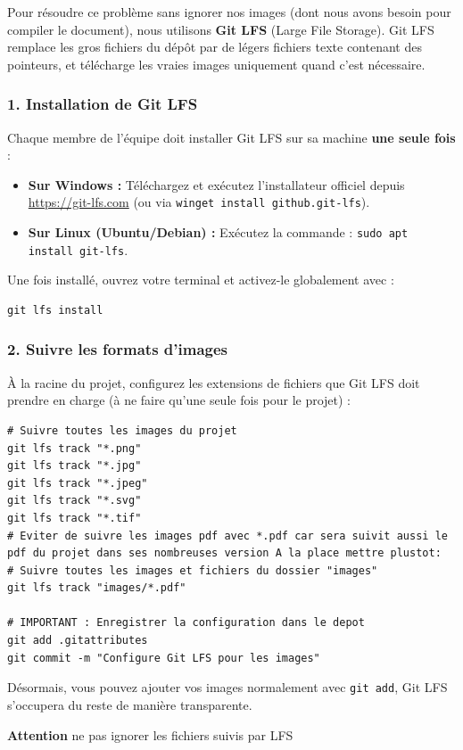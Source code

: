\documentclass[11pt,a4paper]{article}
\begin{document}
Pour résoudre ce problème sans ignorer nos images (dont nous avons besoin pour compiler le document), nous utilisons \textbf{Git LFS} (Large File Storage). Git LFS remplace les gros fichiers du dépôt par de légers fichiers texte contenant des pointeurs, et télécharge les vraies images uniquement quand c'est nécessaire.

\subsubsection*{1. Installation de Git LFS}
Chaque membre de l'équipe doit installer Git LFS sur sa machine \textbf{une seule fois} :
\begin{itemize}
	\item \textbf{Sur Windows :} Téléchargez et exécutez l'installateur officiel depuis \url{https://git-lfs.com} (ou via \texttt{winget install github.git-lfs}).
	\item \textbf{Sur Linux (Ubuntu/Debian) :} Exécutez la commande : \texttt{sudo apt install git-lfs}.
\end{itemize}
Une fois installé, ouvrez votre terminal et activez-le globalement avec :
\begin{lstlisting}[style=bashstyle]
	git lfs install
\end{lstlisting}

\subsubsection*{2. Suivre les formats d'images}
À la racine du projet, configurez les extensions de fichiers que Git LFS doit prendre en charge (à ne faire qu'une seule fois pour le projet) :
\begin{lstlisting}[style=bashstyle]
# Suivre toutes les images du projet
git lfs track "*.png"
git lfs track "*.jpg"
git lfs track "*.jpeg"
git lfs track "*.svg"
git lfs track "*.tif"
# Eviter de suivre les images pdf avec *.pdf car sera suivit aussi le pdf du projet dans ses nombreuses version A la place mettre plustot: 
# Suivre toutes les images et fichiers du dossier "images"
git lfs track "images/*.pdf"

# IMPORTANT : Enregistrer la configuration dans le depot
git add .gitattributes
git commit -m "Configure Git LFS pour les images"
\end{lstlisting}
Désormais, vous pouvez ajouter vos images normalement avec \texttt{git add}, Git LFS s'occupera du reste de manière transparente.

\textbf{Attention} ne pas ignorer les fichiers suivis par LFS
\end{document}
